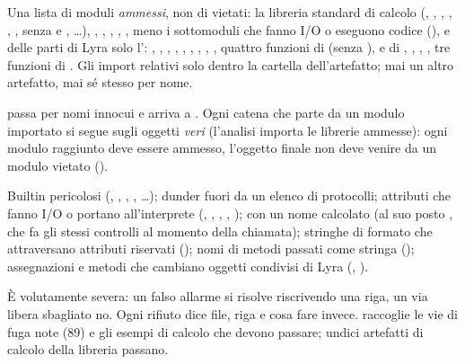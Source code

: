 \begin{description}[leftmargin = 0pt, style = nextline, itemsep = 6pt]
\item[Gli import]
  Una lista di moduli \emph{ammessi}, non di vietati: la libreria standard di
  calcolo (, , , ,
  , ,  senza  e ,
  \ldots), , , , ,
  ,  meno i sottomoduli che fanno I/O o
  eseguono codice (), e delle parti di Lyra solo
  l': , , ,
  , , ,
  , ,
  , quattro funzioni di  (senza
  ),  e  di
  , ,
  , , tre funzioni di
  . Gli import relativi solo dentro la cartella
  dell'artefatto; mai un altro artefatto, mai sé stesso per nome.
\item[Le catene risolte]
   passa per nomi innocui e arriva a
  . Ogni catena che parte da un modulo importato si segue sugli
  oggetti \emph{veri} (l'analisi importa le librerie ammesse): ogni modulo
  raggiunto deve essere ammesso, l'oggetto finale non deve venire da un modulo
  vietato ().
\item[I nomi]
  Builtin pericolosi (, , , ,
  \ldots); dunder fuori da un elenco di protocolli; attributi che fanno I/O o
  portano all'interprete (, , ,
  , );  con un nome calcolato
  (al suo posto , che fa gli stessi controlli al
  momento della chiamata); stringhe di formato che attraversano attributi
  riservati (); nomi di metodi passati come
  stringa (); assegnazioni e metodi che cambiano oggetti
  condivisi di Lyra (, ).
\end{description}

\noindent
È volutamente severa: un falso allarme si risolve riscrivendo una riga, un via
libera sbagliato no. Ogni rifiuto dice file, riga e cosa fare invece.
 raccoglie le vie di fuga note (\num{89})
e gli esempi di calcolo che devono passare; undici artefatti di calcolo della
libreria passano.

